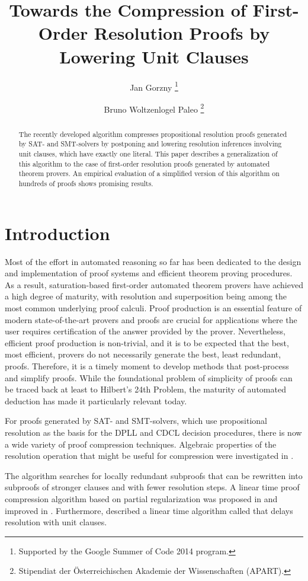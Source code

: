 \documentclass{llncs}
\title{Towards the Compression of First-Order Resolution Proofs by Lowering Unit Clauses}
\author{
  Jan Gorzny\inst{1}
  \thanks{Supported by the Google Summer of Code 2014 program.}
  \and 
  Bruno Woltzenlogel Paleo\inst{2}
  \thanks{Stipendiat der \"Osterreichischen Akademie der Wissenschaften (APART).}
}
\institute{
  \email{jgorzny@uvic.ca}, University of Victoria, Canada
  \and 
  \email{bruno@logic.at}, Vienna University of Technology, Austria
}
\begin{document}
\maketitle


\begin{abstract}
The recently developed {\LowerUnits} algorithm compresses
propositional resolution proofs generated by SAT- and SMT-solvers by postponing and lowering resolution inferences involving unit clauses, which have exactly one literal. This paper describes a generalization of this algorithm to the case of first-order resolution proofs generated by automated theorem provers. An empirical evaluation of a simplified version of this algorithm on hundreds of proofs shows promising results.
\end{abstract}


\setcounter{footnote}{0}


\section{Introduction}

Most of the effort in automated reasoning so far has been dedicated to the design and implementation of proof systems and efficient theorem proving procedures. As a result, saturation-based first-order automated theorem provers have achieved a high degree of maturity, with resolution and superposition being among the most common underlying proof calculi. Proof production is an essential feature of modern state-of-the-art provers and proofs are crucial for applications where the user requires certification of the answer provided by the prover. Nevertheless, efficient proof production is 
non-trivial,
and it is to be expected that the best, most efficient, provers do not necessarily generate the best, least redundant, proofs. Therefore, it is a timely moment to develop methods that post-process and simplify proofs. While the foundational problem of simplicity of proofs can be traced back at least to Hilbert's 24th Problem, the maturity of automated deduction has made it particularly relevant today.  

For proofs generated by SAT- and SMT-solvers, which use propositional resolution as the basis for the DPLL and CDCL decision procedures, there is now a wide variety of proof compression techniques. Algebraic properties of the resolution
operation that might be useful for compression were investigated in \cite{bwp10}.

The {\ReduceReconstruct} algorithm \cite{RedRec} searches for locally redundant
subproofs that can be rewritten into subproofs of stronger clauses and with fewer resolution steps.
A linear time proof compression algorithm based on partial
regularization was proposed in \cite{RP08} and improved in \cite{LURPI}. Furthermore, \cite{LURPI} described a linear time algorithm called {\LowerUnits} that delays resolution with unit clauses.
\end{document}
